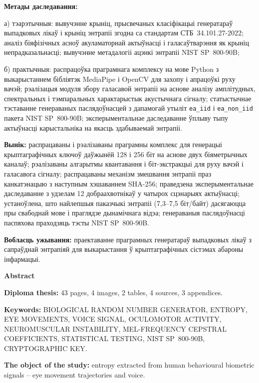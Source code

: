 \documentclass[14pt, a4paper]{extreport}
\begin{document}
\textbf{Метады даследавання:}
 
а) тэарэтычныя: вывучэнне крыніц, прысвечаных класіфікацыі генератараў
выпадковых лікаў і крыніц энтрапіі згодна са стандартам СТБ~34.101.27-2022;
аналіз біяфізічных асноў акуламаторнай актыўнасці і галасаўтварэння як
крыніц непрадказальнасці; вывучэнне метадалогіі ацэнкі энтрапіі
NIST SP~800-90B;
 
б) практычныя: распрацоўка праграмнага комплексу на мове Python з
выкарыстаннем бібліятэк MediaPipe і OpenCV для захопу і апрацоўкі руху вачэй;
рэалізацыя модуля збору галасавой энтрапіі на аснове аналізу амплітудных,
спектральных і тэмпаральных характарыстык акустычнага сігналу; статыстычнае
тэставанне генераваных паслядоўнасцей з дапамогай утыліт \texttt{ea\_iid}
і \texttt{ea\_non\_iid} пакета NIST SP~800-90B; эксперыментальнае даследаванне
ўплыву тыпу актыўнасці карыстальніка на якасць здабываемай энтрапіі.
 
\textbf{Вынік:} распрацаваны і рэалізаваны праграмны комплекс для генерацыі
крыптаграфічных ключоў даўжынёй 128 і 256 біт на аснове двух біяметрычных
каналаў; рэалізаваны алгарытмы квантавання і біт-экстракцыі для руху вачэй
і галасавога сігналу; распрацаваны механізм змешвання энтрапіі праз
канкатэнацыю з наступным хэшаваннем SHA-256; праведзена эксперыментальнае
даследаванне з удзелам 12 добраахвотнікаў у чатырох сцэнарыях актыўнасці;
устаноўлена, што найлепшыя паказчыкі энтрапіі (7{,}3--7{,}5 біт/байт)
дасягаюцца пры свабоднай мове і праглядзе дынамічнага відэа; генераваныя
паслядоўнасці паспяхова праходзяць тэсты NIST SP~800-90B.
 
\textbf{Вобласць ужывання:} праектаванне праграмных генератараў выпадковых
лікаў з сапраўднай энтрапіяй для выкарыстання ў крыптаграфічных сістэмах
абароны інфармацыі.
 
 
 
\newpage
\begin{center}{\bf \Large Abstract}\end{center}
 
\textbf{Diploma thesis:} 43 pages, 4 images, 2 tables, 4 sources, 3 appendices.
 
\textbf{Keywords:} BIOLOGICAL RANDOM NUMBER GENERATOR, ENTROPY, EYE
MOVEMENTS, VOICE SIGNAL, OCULOMOTOR ACTIVITY, NEUROMUSCULAR INSTABILITY,
MEL-FREQUENCY CEPSTRAL COEFFICIENTS, STATISTICAL TESTING, NIST SP~800-90B,
CRYPTOGRAPHIC KEY.
 
\textbf{The object of the study:} entropy extracted from human behavioural
biometric signals -- eye movement trajectories and voice.
 
\end{document}
